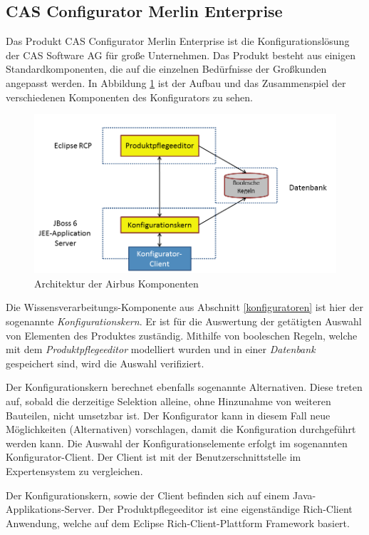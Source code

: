 \subsection{CAS Configurator Merlin Enterprise} \label{configurator}
Das Produkt CAS Configurator Merlin Enterprise ist die Konfigurationslösung der CAS Software AG für große Unternehmen. Das Produkt besteht aus einigen Standardkomponenten, die auf die einzelnen Bedürfnisse der Großkunden angepasst werden. In Abbildung \ref{airbus_structure} ist der Aufbau und das Zusammenspiel der verschiedenen Komponenten des Konfigurators zu sehen. \par
\begin{figure}
\centering
\includegraphics[width=\hsize]{images/AirbusAufbau}
\caption{Architektur der Airbus Komponenten}
\label{airbus_structure}
\end{figure}
Die Wissensverarbeitungs-Komponente aus Abschnitt \ref{konfiguratoren} ist hier der sogenannte \textit{Konfigurationskern}. Er ist für die Auswertung der getätigten Auswahl von Elementen des Produktes zuständig. Mithilfe von booleschen Regeln, welche mit dem \textit{Produktpflegeeditor} modelliert wurden und in einer \textit{Datenbank} gespeichert sind, wird die Auswahl verifiziert.
\par
 Der Konfigurationskern berechnet ebenfalls sogenannte Alternativen. Diese treten auf, sobald die derzeitige Selektion alleine, ohne Hinzunahme von weiteren Bauteilen, nicht umsetzbar ist. Der Konfigurator kann in diesem Fall neue Möglichkeiten (Alternativen) vorschlagen, damit die Konfiguration durchgeführt werden kann. Die Auswahl der Konfigurationselemente erfolgt im sogenannten Konfigurator-Client. Der Client ist mit der Benutzerschnittstelle im Expertensystem zu vergleichen. \par

Der Konfigurationskern, sowie der Client befinden sich auf einem Java-Applikations-Server. Der Produktpflegeeditor ist eine eigenständige Rich-Client Anwendung, welche auf dem Eclipse Rich-Client-Plattform Framework\cite{bib:eclipseRCP} basiert.

